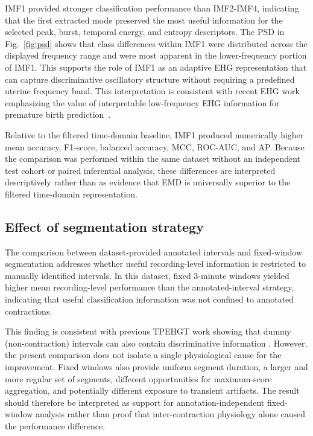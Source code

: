 \documentclass[10pt,letterpaper]{article}
\begin{document}
IMF1 provided stronger classification performance than IMF2-IMF4, indicating that the first extracted mode preserved the most useful information for the selected peak, burst, temporal energy, and entropy descriptors. The PSD in Fig.~\ref{fig:psd} shows that class differences within IMF1 were distributed across the displayed frequency range and were most apparent in the lower-frequency portion of IMF1. This supports the role of IMF1 as an adaptive EHG representation that can capture discriminative oscillatory structure without requiring a predefined uterine frequency band. This interpretation is consistent with recent EHG work emphasizing the value of interpretable low-frequency EHG information for premature birth prediction~\cite{Pirnar2024}.

Relative to the filtered time-domain baseline, IMF1 produced numerically higher mean accuracy, F1-score, balanced accuracy, MCC, ROC-AUC, and AP. Because the comparison was performed within the same dataset without an independent test cohort or paired inferential analysis, these differences are interpreted descriptively rather than as evidence that EMD is universally superior to the filtered time-domain representation.

\subsection*{Effect of segmentation strategy}
The comparison between dataset-provided annotated intervals and fixed-window segmentation addresses whether useful recording-level information is restricted to manually identified intervals. In this dataset, fixed 3-minute windows yielded higher mean recording-level performance than the annotated-interval strategy, indicating that useful classification information was not confined to annotated contractions.

This finding is consistent with previous TPEHGT work showing that dummy (non-contraction) intervals can also contain discriminative information \cite{Jager2018_TPEHGT}. However, the present comparison does not isolate a single physiological cause for the improvement. Fixed windows also provide uniform segment duration, a larger and more regular set of segments, different opportunities for maximum-score aggregation, and potentially different exposure to transient artifacts. The result should therefore be interpreted as support for annotation-independent fixed-window analysis rather than proof that inter-contraction physiology alone caused the performance difference.
\end{document}
